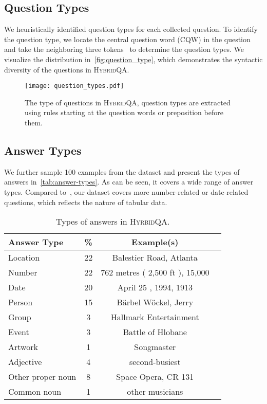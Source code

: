 \documentclass[11pt,a4paper]{article}
\newcommand{\dataset}{\textsc{HybridQA}\xspace}
\begin{document}
\subsection{Question Types}
We heuristically identified question types for each collected question. To identify the question type, we locate the central question word (CQW) in the question and take the neighboring three tokens~\cite{yang2018hotpotqa} to determine the question types. We visualize the distribution in~\autoref{fig:question_type}, which demonstrates the syntactic diversity of the questions in \dataset.

\begin{figure}[thb]
    \centering
    \texttt{[image: question\_types.pdf]}
\caption{The type of questions in \dataset, question types are extracted using rules starting at the question words or preposition before them. }
    \label{fig:question_type}
\end{figure}

\subsection{Answer Types}
We further sample 100 examples from the dataset and present the types of answers in~\autoref{tab:answer-types}. As can be seen, it covers a wide range of answer types. Compared to~\cite{yang2018hotpotqa}, our dataset covers more number-related or date-related questions, which reflects the nature of tabular data. 


\begin{table}[htbp]
\small
\begin{center}
\begin{tabular}{lccc}
\toprule
Answer Type & \% & Example(s) \\
\midrule
Location  & 22  & Balestier Road, Atlanta\\
Number  & 22  & 762 metres ( 2,500 ft ), 15,000\\
Date  & 20  & April 25 , 1994, 1913\\
Person  & 15  & Bärbel Wöckel, Jerry\\
Group  & 3  & Hallmark Entertainment\\
Event  & 3  & Battle of Hlobane\\
Artwork  & 1  & Songmaster\\
Adjective & 4 & second-busiest\\
Other proper noun  & 8  & Space Opera, CR 131\\
Common noun  & 1  & other musicians\\
\bottomrule
\end{tabular}
\end{center}
\caption{Types of answers in \textsc{HyrbidQA}.}
\label{tab:answer-types}
\end{table}
\end{document}
